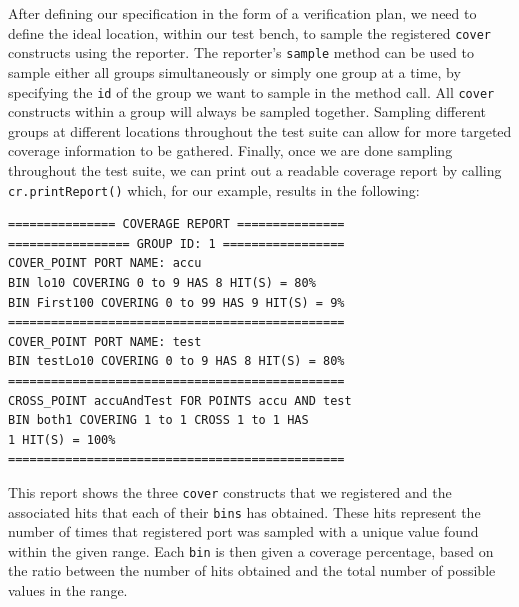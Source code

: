 \documentclass[conference]{IEEEtran}
\begin{document}
After defining our specification in the form of a verification plan, we need to define the ideal location, within our test bench, to sample the registered \texttt{cover} constructs using the reporter.
The reporter's \texttt{sample} method can be used to sample either all groups simultaneously or simply one group at a time, by specifying the \texttt{id} of the group we want to sample in the method call.
All \texttt{cover} constructs within a group will always be sampled together.
Sampling different groups at different locations throughout the test suite can allow for more targeted coverage information to be gathered.
Finally, once we are done sampling throughout the test suite, we can print out a readable coverage report by calling \texttt{cr.printReport()} which, for our example, results in the following: 

\begin{verbatim}
=============== COVERAGE REPORT ===============
================= GROUP ID: 1 =================
COVER_POINT PORT NAME: accu
BIN lo10 COVERING 0 to 9 HAS 8 HIT(S) = 80%
BIN First100 COVERING 0 to 99 HAS 9 HIT(S) = 9%
===============================================
COVER_POINT PORT NAME: test
BIN testLo10 COVERING 0 to 9 HAS 8 HIT(S) = 80%
===============================================
CROSS_POINT accuAndTest FOR POINTS accu AND test
BIN both1 COVERING 1 to 1 CROSS 1 to 1 HAS
1 HIT(S) = 100%
===============================================
\end{verbatim}

This report shows the three \texttt{cover} constructs that we registered and the associated hits that each of their \texttt{bins} has obtained.
These hits represent the number of times that registered port was sampled with a unique value found within the given range.
Each \texttt{bin} is then given a coverage percentage, based on the ratio between the number of hits obtained and the total number of possible values in the range.
\end{document}
